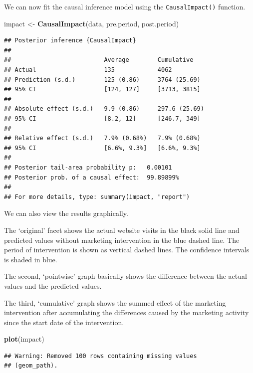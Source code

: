 \documentclass[]{book}
\newenvironment{Shaded}{\begin{snugshade}}{\end{snugshade}}
\newcommand{\KeywordTok}[1]{\textcolor[rgb]{0.13,0.29,0.53}{\textbf{#1}}}
\newcommand{\NormalTok}[1]{#1}
\newcommand{\StringTok}[1]{\textcolor[rgb]{0.31,0.60,0.02}{#1}}
\begin{document}
We can now fit the causal inference model using the \texttt{CausalImpact()} function.

\begin{Shaded}
\begin{Highlighting}[]
\NormalTok{impact <-}\StringTok{ }\KeywordTok{CausalImpact}\NormalTok{(data, pre.period, post.period)}
\end{Highlighting}
\end{Shaded}

\begin{verbatim}
## Posterior inference {CausalImpact}
## 
##                          Average        Cumulative   
## Actual                   135            4062         
## Prediction (s.d.)        125 (0.86)     3764 (25.69) 
## 95% CI                   [124, 127]     [3713, 3815] 
##                                                      
## Absolute effect (s.d.)   9.9 (0.86)     297.6 (25.69)
## 95% CI                   [8.2, 12]      [246.7, 349] 
##                                                      
## Relative effect (s.d.)   7.9% (0.68%)   7.9% (0.68%) 
## 95% CI                   [6.6%, 9.3%]   [6.6%, 9.3%] 
## 
## Posterior tail-area probability p:   0.00101
## Posterior prob. of a causal effect:  99.89899%
## 
## For more details, type: summary(impact, "report")
\end{verbatim}

We can also view the results graphically.

The `original' facet shows the actual website visits in the black solid line and predicted values without marketing intervention in the blue dashed line. The period of intervention is shown as vertical dashed lines. The confidence intervals is shaded in blue.

The second, `pointwise' graph basically shows the difference between the actual values and the predicted values.

The third, `cumulative' graph shows the summed effect of the marketing intervention after accumulating the differences caused by the marketing activity since the start date of the intervention.

\begin{Shaded}
\begin{Highlighting}[]
\KeywordTok{plot}\NormalTok{(impact)}
\end{Highlighting}
\end{Shaded}

\begin{verbatim}
## Warning: Removed 100 rows containing missing values
## (geom_path).
\end{verbatim}
\end{document}
